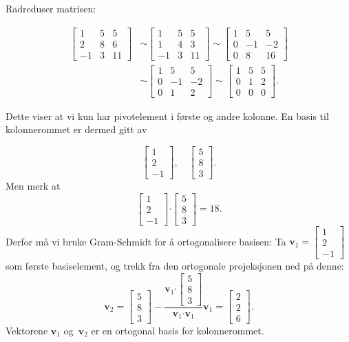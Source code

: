\documentclass[titlepage,a4paper,12pt,norsk]{IMFeksamen}
\newcommand{\V}[1]{\mathbf{#1}}
\newcommand{\vvv}[3]{\begin{bmatrix} #1 \\ #2 \\ #3 \end{bmatrix}}
\newcommand{\0}{\V{0}}
\begin{document}
\begin{oppgave}
Radreduser matrisen:

\begin{align*}
\begin{bmatrix}
1 & 5 & 5 \\
2 & 8 & 6 \\
-1 & 3 & 11
\end{bmatrix} &\sim
\begin{bmatrix}
1 & 5 & 5 \\
1 & 4 & 3 \\
-1 & 3 & 11
\end{bmatrix} \sim
\begin{bmatrix}
1 & 5 & 5 \\
0 & -1 & -2 \\
0 & 8 & 16
\end{bmatrix}\\ &\sim
\begin{bmatrix}
1 & 5 & 5 \\
0 & -1 & -2 \\
0 & 1 & 2
\end{bmatrix} \sim
\begin{bmatrix}
1 & 5 & 5 \\
0 & 1 & 2 \\
0 & 0 & 0
\end{bmatrix}.
\end{align*}

Dette viser at vi kun har pivotelement i første og andre kolonne. En basis til kolonnerommet er dermed gitt av 

$$\vvv{1}{2}{-1}, \quad \vvv{5}{8}{3}.$$
Men merk at 
$$\vvv{1}{2}{-1} \boldsymbol{\cdot} \vvv{5}{8}{3} =18. $$
Derfor må vi bruke Gram-Schmidt for å ortogonalisere basisen:
Ta $\V{v}_1=\vvv{1}{2}{-1}$ som første basiselement, og trekk fra den ortogonale projeksjonen ned på denne:
$$\V{v}_2=\vvv{5}{8}{3}-\frac{\V{v}_1 \boldsymbol{\cdot} \vvv{5}{8}{3}}{\V{v}_1 \boldsymbol{\cdot} \V{v}_1} \V{v}_1=\vvv{2}{2}{6}.$$
Vektorene $\V{v}_1$ og~$\V{v}_2$ er en ortogonal basis for kolonnerommet.

\end{oppgave}
\end{document}
